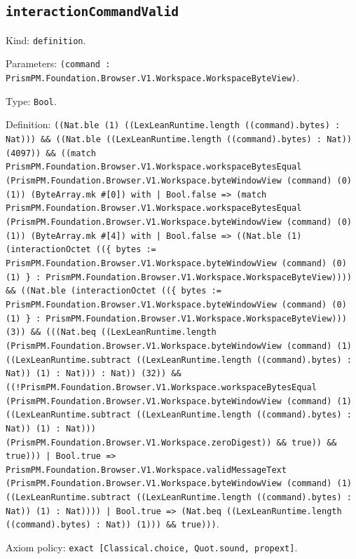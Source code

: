 \documentclass[11pt]{article}
\begin{document}
\subsection*{\texttt{interactionCommandValid}}
\noindent Kind: \texttt{definition}.\par
\noindent Parameters: \texttt{(command : PrismPM.Foundation.Browser.V1.Workspace.WorkspaceByteView)}.\par
\noindent Type: \texttt{Bool}.\par
\noindent Definition: \texttt{((Nat.ble (1) ((LexLeanRuntime.length ((command).bytes) : Nat))) \&\& ((Nat.ble ((LexLeanRuntime.length ((command).bytes) : Nat)) (4097)) \&\& ((match PrismPM.Foundation.Browser.V1.Workspace.workspaceBytesEqual (PrismPM.Foundation.Browser.V1.Workspace.byteWindowView (command) (0) (1)) (ByteArray.mk \#[0]) with | Bool.false => (match PrismPM.Foundation.Browser.V1.Workspace.workspaceBytesEqual (PrismPM.Foundation.Browser.V1.Workspace.byteWindowView (command) (0) (1)) (ByteArray.mk \#[4]) with | Bool.false => ((Nat.ble (1) (interactionOctet ((\{ bytes := PrismPM.Foundation.Browser.V1.Workspace.byteWindowView (command) (0) (1) \} : PrismPM.Foundation.Browser.V1.Workspace.WorkspaceByteView)))) \&\& ((Nat.ble (interactionOctet ((\{ bytes := PrismPM.Foundation.Browser.V1.Workspace.byteWindowView (command) (0) (1) \} : PrismPM.Foundation.Browser.V1.Workspace.WorkspaceByteView))) (3)) \&\& (((Nat.beq ((LexLeanRuntime.length (PrismPM.Foundation.Browser.V1.Workspace.byteWindowView (command) (1) ((LexLeanRuntime.subtract ((LexLeanRuntime.length ((command).bytes) : Nat)) (1) : Nat))) : Nat)) (32)) \&\& ((!PrismPM.Foundation.Browser.V1.Workspace.workspaceBytesEqual (PrismPM.Foundation.Browser.V1.Workspace.byteWindowView (command) (1) ((LexLeanRuntime.subtract ((LexLeanRuntime.length ((command).bytes) : Nat)) (1) : Nat))) (PrismPM.Foundation.Browser.V1.Workspace.zeroDigest)) \&\& true)) \&\& true))) | Bool.true => PrismPM.Foundation.Browser.V1.Workspace.validMessageText (PrismPM.Foundation.Browser.V1.Workspace.byteWindowView (command) (1) ((LexLeanRuntime.subtract ((LexLeanRuntime.length ((command).bytes) : Nat)) (1) : Nat)))) | Bool.true => (Nat.beq ((LexLeanRuntime.length ((command).bytes) : Nat)) (1))) \&\& true)))}.\par
\noindent Axiom policy: \texttt{exact [Classical.choice, Quot.sound, propext]}.\par
\end{document}
